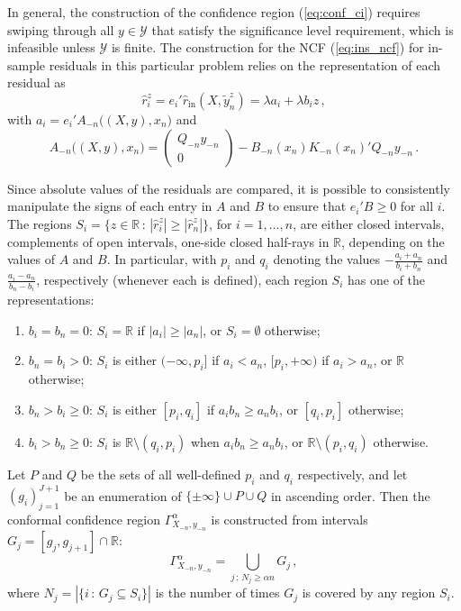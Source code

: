 \documentclass[a4paper]{article}
\newcommand{\Ycal}{\mathcal{Y}}
\newcommand{\Real}{\mathbb{R}}
\begin{document}
In general, the construction of the confidence region (\ref{eq:conf_ci}) requires
swiping through all $y\in \Ycal$ that satisfy the significance level requirement,
which is infeasible unless $\Ycal$ is finite. The construction for the NCF (\ref{eq:ins_ncf})
for in-sample residuals in this particular problem relies on the representation
of each residual as
\begin{equation*}
  \hat{r}_i^z
    = e_i' \hat{r}_{\text{in}}(X, \tilde{y}_n^z)
    = \lambda a_i + \lambda b_i z
    \,,
\end{equation*}
with $a_i = e_i' A_{-n}\bigl((X, y), x_n\bigr)$ and
\begin{equation*}
  A_{-n}\bigl((X, y), x_n\bigr)
    = \begin{pmatrix} Q_{-n} y_{-n} \\ 0 \end{pmatrix}
      - B_{-n}(x_n) K_{-n}(x_n)' Q_{-n} y_{-n}
    \,.
\end{equation*}

Since absolute values of the residuals are compared, it is possible to consistently
manipulate the signs of each entry in $A$ and $B$ to ensure that $e_i'B\geq 0$ for
all $i$. The regions $S_i = \{z\in\Real\,:\, |\hat{r}_i^z| \geq |\hat{r}_n^z|\}$, for
$i=1,\ldots, n$, are either closed intervals, complements of open intervals,
one-side closed half-rays in $\Real$, depending on the values of $A$ and $B$. In
particular, with $p_i$ and $q_i$ denoting the values $-\frac{a_i+a_n}{b_i+b_n}$ and
$\frac{a_i-a_n}{b_n-b_i}$, respectively (whenever each is defined), each region
$S_i$ has one of the representations:
\begin{enumerate}
  \item $b_i=b_n=0$: $S_i = \Real$ if $|a_i| \geq |a_n|$, or $S_i = \emptyset$
  otherwise;
  \item $b_n = b_i > 0$: $S_i$ is either $(-\infty, p_i]$ if $a_i < a_n$, $[p_i, +\infty)$ if
  $a_i > a_n$, or $\Real$ otherwise;
  \item $b_n > b_i \geq 0$: $S_i$ is either $[p_i, q_i]$ if $a_i b_n \geq a_n b_i$,
  or $[q_i, p_i]$ otherwise;
  \item $b_i > b_n \geq 0$: $S_i$ is $\Real\setminus (q_i, p_i)$ when $a_i b_n \geq a_n b_i$,
  or $\Real\setminus (p_i, q_i)$ otherwise.
\end{enumerate}
Let $P$ and $Q$ be the sets of all well-defined $p_i$ and $q_i$ respectively, and let
$(g_i)_{j=1}^{J+1}$ be an enumeration of $\{\pm\infty\}\cup P \cup Q$ in ascending
order. Then the conformal confidence region $\Gamma_{X_{-n}, y_{-n}}^\alpha$ is
constructed from intervals $G_j = [g_j, g_{j+1}] \cap \Real$:
\begin{equation*}\label{eq:rrcm_conf_ci}
  \Gamma_{X_{-n}, y_{-n}}^\alpha
    = \bigcup_{j\,:\, N_j \geq \alpha n} G_j
    \,,
\end{equation*}
where $N_j = |\{i\,:\,G_j \subseteq S_i\}|$ is the number of times $G_j$ is covered by
any region $S_i$.
\end{document}
